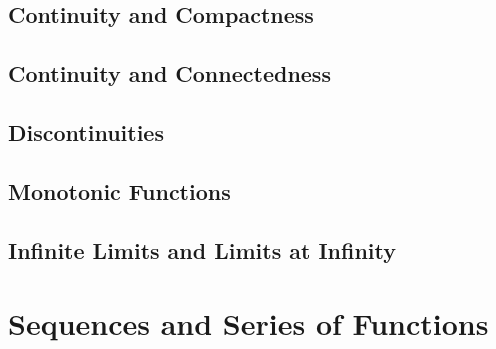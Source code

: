 \section{Continuity and Compactness}

\section{Continuity and Connectedness}

\section{Discontinuities}

\section{Monotonic Functions}

\section{Infinite Limits and Limits at Infinity}

\chapter{Sequences and Series of Functions}
